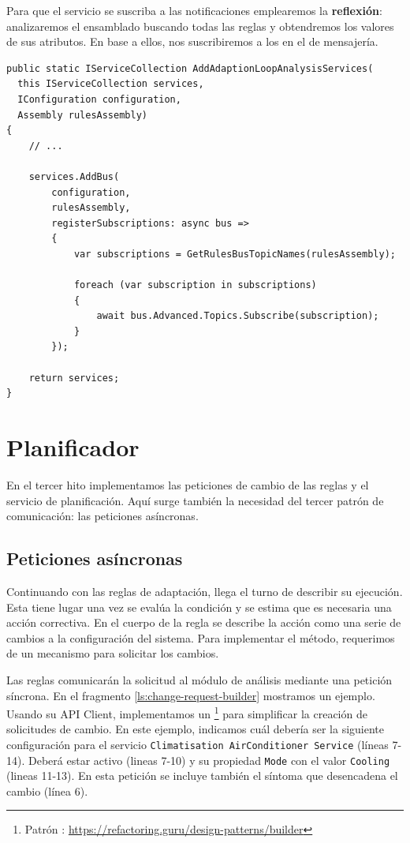 Para que el servicio se suscriba a las notificaciones emplearemos la \textbf{reflexión}: analizaremos el ensamblado buscando todas las reglas y obtendremos los valores de sus atributos. En base a ellos, nos suscribiremos a los  en el  de mensajería.

\begin{lstlisting}[language={[Sharp]C},caption={Para suscribirnos a los \foreign{english}{topics} de las notificaciones obtenemos las dependencias de las reglas mediante reflexión.},captionpos=b, label=ls:rules-registration]
public static IServiceCollection AddAdaptionLoopAnalysisServices(
  this IServiceCollection services,
  IConfiguration configuration,
  Assembly rulesAssembly)
{
    // ...

    services.AddBus(
        configuration,
        rulesAssembly,
        registerSubscriptions: async bus =>
        {
            var subscriptions = GetRulesBusTopicNames(rulesAssembly);

            foreach (var subscription in subscriptions)
            {
                await bus.Advanced.Topics.Subscribe(subscription);
            }
        });

    return services;
}
\end{lstlisting}

\section{Planificador}

En el tercer hito implementamos las peticiones de cambio de las reglas y el servicio de planificación. Aquí surge también la necesidad del tercer patrón de comunicación: las peticiones asíncronas.

\subsection{Peticiones asíncronas}

Continuando con las reglas de adaptación, llega el turno de describir su ejecución. Esta tiene lugar una vez se evalúa la condición y se estima que es necesaria una acción correctiva. En el cuerpo de la regla se describe la acción como una serie de cambios a la configuración del sistema. Para implementar el método, requerimos de un mecanismo para solicitar los cambios.

Las reglas comunicarán la solicitud al módulo de análisis mediante una petición síncrona. En el fragmento \ref{ls:change-request-builder} mostramos un ejemplo. Usando su API Client, implementamos un \footnote{Patrón : \url{https://refactoring.guru/design-patterns/builder}} para simplificar la creación de solicitudes de cambio. En este ejemplo, indicamos cuál debería ser la siguiente configuración para el servicio \texttt{Climatisation AirConditioner Service} (líneas 7-14). Deberá estar activo (lineas 7-10) y su propiedad \texttt{Mode} con el valor \texttt{Cooling} (lineas 11-13). En esta petición se incluye también el síntoma que desencadena el cambio (línea 6).

